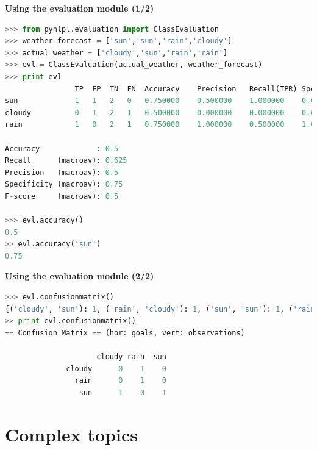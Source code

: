 \documentclass[compress]{beamer}
\begin{document}
\begin{frame}[fragile]

\textbf{Using the evaluation module (1/2)} 

\footnotesize
\begin{lstlisting}[language=python]
>>> from pynlpl.evaluation import ClassEvaluation
>>> weather_forecast = ['sun','sun','rain','cloudy']
>>> actual_weather = ['cloudy','sun','rain','rain']
>>> evl = ClassEvaluation(actual_weather, weather_forecast)
>>> print evl
                TP	FP	TN	FN	Accuracy	Precision	Recall(TPR)	Specificity(TNR)	F-score
sun             1	1	2	0	0.750000	0.500000	1.000000	0.666667	0.666667
cloudy          0	1	2	1	0.500000	0.000000	0.000000	0.666667	0.000000
rain            1	0	2	1	0.750000	1.000000	0.500000	1.000000	0.666667

Accuracy             : 0.5
Recall      (macroav): 0.625
Precision   (macroav): 0.5
Specificity (macroav): 0.75
F-score     (macroav): 0.5

>>> evl.accuracy()
0.5
>> evl.accuracy('sun')
0.75
\end{lstlisting}
\normalsize


\end{frame}

\begin{frame}[fragile]
 
\textbf{Using the evaluation module (2/2)} 

\begin{lstlisting}[language=python]
>>> evl.confusionmatrix()
{('cloudy', 'sun'): 1, ('rain', 'cloudy'): 1, ('sun', 'sun'): 1, ('rain', 'rain'): 1}
>> print evl.confusionmatrix()
== Confusion Matrix == (hor: goals, vert: observations)

                     cloudy rain  sun
              cloudy      0    1    0
                rain      0    1    0
                 sun      1    0    1
\end{lstlisting}


\end{frame}

\section{Complex topics}
\end{document}
